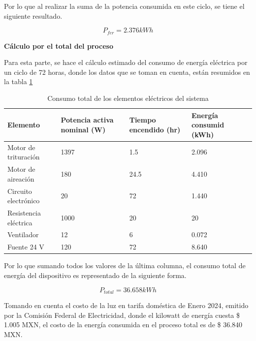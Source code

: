 Por lo que al realizar la suma de la potencia consumida en este ciclo, se tiene el siguiente resultado.

\begin{equation*}
    P_{fer} = 2.376   kWh
\end{equation*}
\newpage

\textbf{Cálculo por el total del proceso}

Para esta parte, se hace el cálculo estimado del consumo de energía eléctrica por un ciclo de 72 horas, donde los datos que se toman en cuenta, están resumidos en la tabla \ref{tab:Electrical_values_total}

\begin{table}
    \centering
\caption{Consumo total de los elementos eléctricos del sistema}
\label{tab:Electrical_values_total}
    \begin{tabular}{|m{2.5cm}|m{2.5cm}|m{2.5cm}|m{2.5cm}|} \hline 
         Elemento&  Potencia activa nominal (W)&Tiempo encendido (hr)&Energía consumid (kWh)\\ \hline 
         Motor de trituración&  1397&1.5&2.096\\ \hline 
         Motor de aireación&  180&24.5&4.410\\ \hline 
         Circuito electrónico&  20&72&1.440\\ \hline 
         Resistencia eléctrica&  1000&20&20\\ \hline 
         Ventilador&  12&6&0.072\\ \hline 
         Fuente 24 V&  120&72&8.640\\ \hline
    \end{tabular}
    
    
\end{table}

Por lo que sumando todos los valores de la última columna, el consumo total de energía del dispositivo es representado de la siguiente forma.

\begin{equation*}
    P_{total} = 36.658 kWh
\end{equation*}

Tomando en cuenta el costo de la luz en tarifa doméstica de Enero 2024, emitido por la Comisión Federal de Electricidad, donde el kilowatt de energía cuesta \$ 1.005 MXN, el costo de la energía consumida en el proceso total es de \$ 36.840 MXN.

\clearpage